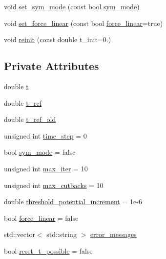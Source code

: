 \begin{DoxyCompactItemize}
void \hyperlink{classincremental_f_e_1_1_global_data_incremental_f_e_a8378d6a77b65364d8036f8a111e86de0}{set\+\_\+sym\+\_\+mode} (const bool \hyperlink{classincremental_f_e_1_1_global_data_incremental_f_e_a9986ee5bfccc1b5936c585cf0c5a4474}{sym\+\_\+mode})
\item 
void \hyperlink{classincremental_f_e_1_1_global_data_incremental_f_e_aba65d5da0031c2f1bc1ceb87dc524b8d}{set\+\_\+force\+\_\+linear} (const bool \hyperlink{classincremental_f_e_1_1_global_data_incremental_f_e_a37c1d42902e74f13f3c4ba82d2dabd67}{force\+\_\+linear}=true)
\item 
void \hyperlink{classincremental_f_e_1_1_global_data_incremental_f_e_a74424d0040a6f5c2aa545288b42483f4}{reinit} (const double t\+\_\+init=0.)
\end{DoxyCompactItemize}
\subsection*{Private Attributes}
\begin{DoxyCompactItemize}
\item 
double \hyperlink{classincremental_f_e_1_1_global_data_incremental_f_e_abb14e15389af3772905a3c75e12ed2c0}{t}
\item 
double \hyperlink{classincremental_f_e_1_1_global_data_incremental_f_e_a6ddf751a2f8abff9353d12e469e38f96}{t\+\_\+ref}
\item 
double \hyperlink{classincremental_f_e_1_1_global_data_incremental_f_e_ad808aad6cdbfa6eddad05fb85c056d11}{t\+\_\+ref\+\_\+old}
\item 
unsigned int \hyperlink{classincremental_f_e_1_1_global_data_incremental_f_e_a2aa7544464ad55c39f44c9e7e04b4bf6}{time\+\_\+step} = 0
\item 
bool \hyperlink{classincremental_f_e_1_1_global_data_incremental_f_e_a9986ee5bfccc1b5936c585cf0c5a4474}{sym\+\_\+mode} = false
\item 
unsigned int \hyperlink{classincremental_f_e_1_1_global_data_incremental_f_e_ad15c334652b6a9d6843c360c6e2005ec}{max\+\_\+iter} = 10
\item 
unsigned int \hyperlink{classincremental_f_e_1_1_global_data_incremental_f_e_a7ae58573e9cc241a14976bf19351ba63}{max\+\_\+cutbacks} = 10
\item 
double \hyperlink{classincremental_f_e_1_1_global_data_incremental_f_e_a2f7adb8b4f7f8875715e1dbd0edd9ac8}{threshold\+\_\+potential\+\_\+increment} = 1e-\/6
\item 
bool \hyperlink{classincremental_f_e_1_1_global_data_incremental_f_e_a37c1d42902e74f13f3c4ba82d2dabd67}{force\+\_\+linear} = false
\item 
std\+::vector$<$ std\+::string $>$ \hyperlink{classincremental_f_e_1_1_global_data_incremental_f_e_a47301f72bcb3852b2519b23de833f3eb}{error\+\_\+messages}
\item 
bool \hyperlink{classincremental_f_e_1_1_global_data_incremental_f_e_a23a3040aa83a8867ccb0a8e88bb8cb9e}{reset\+\_\+t\+\_\+possible} = false
\end{DoxyCompactItemize}
